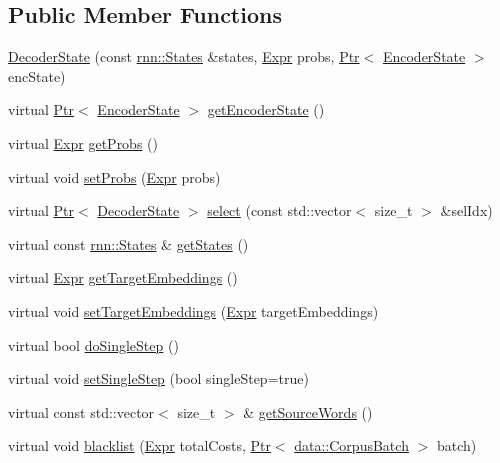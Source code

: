 \subsection*{Public Member Functions}
\begin{DoxyCompactItemize}
\item 
\hyperlink{classmarian_1_1DecoderState_a4b2139b187e040ba2b910310ad5eb136}{Decoder\+State} (const \hyperlink{classmarian_1_1rnn_1_1States}{rnn\+::\+States} \&states, \hyperlink{namespacemarian_a498d8baf75b754011078b890b39c8e12}{Expr} probs, \hyperlink{namespacemarian_ad1a373be43a00ef9ce35666145137b08}{Ptr}$<$ \hyperlink{classmarian_1_1EncoderState}{Encoder\+State} $>$ enc\+State)
\item 
virtual \hyperlink{namespacemarian_ad1a373be43a00ef9ce35666145137b08}{Ptr}$<$ \hyperlink{classmarian_1_1EncoderState}{Encoder\+State} $>$ \hyperlink{classmarian_1_1DecoderState_a1e32dbe1d2757e890cce367911cdf819}{get\+Encoder\+State} ()
\item 
virtual \hyperlink{namespacemarian_a498d8baf75b754011078b890b39c8e12}{Expr} \hyperlink{classmarian_1_1DecoderState_af761b699d78e9545987adc743bc579b8}{get\+Probs} ()
\item 
virtual void \hyperlink{classmarian_1_1DecoderState_a7d99dcec147de0654c049736314e0792}{set\+Probs} (\hyperlink{namespacemarian_a498d8baf75b754011078b890b39c8e12}{Expr} probs)
\item 
virtual \hyperlink{namespacemarian_ad1a373be43a00ef9ce35666145137b08}{Ptr}$<$ \hyperlink{classmarian_1_1DecoderState}{Decoder\+State} $>$ \hyperlink{classmarian_1_1DecoderState_af0f090185bd8f34b53b6a3cf79d7eea3}{select} (const std\+::vector$<$ size\+\_\+t $>$ \&sel\+Idx)
\item 
virtual const \hyperlink{classmarian_1_1rnn_1_1States}{rnn\+::\+States} \& \hyperlink{classmarian_1_1DecoderState_a7ba0022e125c8392b43423107af33f5b}{get\+States} ()
\item 
virtual \hyperlink{namespacemarian_a498d8baf75b754011078b890b39c8e12}{Expr} \hyperlink{classmarian_1_1DecoderState_a93f6000b711e4f710f46268e0781eed4}{get\+Target\+Embeddings} ()
\item 
virtual void \hyperlink{classmarian_1_1DecoderState_a9ba5f20385a0b96e5306dd81bba2a203}{set\+Target\+Embeddings} (\hyperlink{namespacemarian_a498d8baf75b754011078b890b39c8e12}{Expr} target\+Embeddings)
\item 
virtual bool \hyperlink{classmarian_1_1DecoderState_aa05a373b7a8e423af70829189e96fea5}{do\+Single\+Step} ()
\item 
virtual void \hyperlink{classmarian_1_1DecoderState_a670f20d329fe47a6e9a483619bb0c115}{set\+Single\+Step} (bool single\+Step=true)
\item 
virtual const std\+::vector$<$ size\+\_\+t $>$ \& \hyperlink{classmarian_1_1DecoderState_a9ab2da41ff8e8565476f83c7870ad46b}{get\+Source\+Words} ()
\item 
virtual void \hyperlink{classmarian_1_1DecoderState_abc513554a6dec21e221b18def05297cb}{blacklist} (\hyperlink{namespacemarian_a498d8baf75b754011078b890b39c8e12}{Expr} total\+Costs, \hyperlink{namespacemarian_ad1a373be43a00ef9ce35666145137b08}{Ptr}$<$ \hyperlink{classmarian_1_1data_1_1CorpusBatch}{data\+::\+Corpus\+Batch} $>$ batch)
\end{DoxyCompactItemize}
